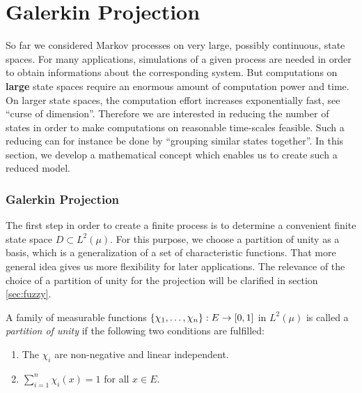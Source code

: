 \section{Galerkin Projection}
\label{sec:galerkin}

So far we considered Markov processes on very large, possibly continuous, state spaces.
For many applications, simulations of a given process are needed in order to obtain informations about the corresponding system. But computations on \textbf{large} state spaces require an enormous amount of computation power and time. On larger state spaces, the computation effort increases exponentially fast, see ``curse of dimension''. 
Therefore we are interested in reducing the number of states in order to make computations on reasonable time-scales feasible.
Such a reducing can for instance be done by ``grouping similar states together''. In this section, we develop a mathematical concept which enables us to create such a reduced model.


\subsubsection*{Galerkin Projection}
The first step in order to create a finite process is to determine a convenient finite state space $D \subset L^2(\mu)$.
For this purpose, we choose a partition of unity as a basis, which is a generalization of a set of characteristic functions.
That more general idea gives us more flexibility for later applications.
The relevance of the choice of a partition of unity for the projection will be clarified in section \ref{sec:fuzzy}.

\begin{defi}
A family of measurable functions  $\{ \chi_1,\dots,\chi_n \}: E \rightarrow [0,1]$ in $L^2(\mu)$ is called a \textit{partition of unity} if the following two conditions are fulfilled:
\begin{enumerate}
\item The $\chi_i$ are non-negative and  linear independent.
\item $\sum_{i=1}^n \chi_i(x) = 1$ for all $x \in E$.
\end{enumerate}
\end{defi}

